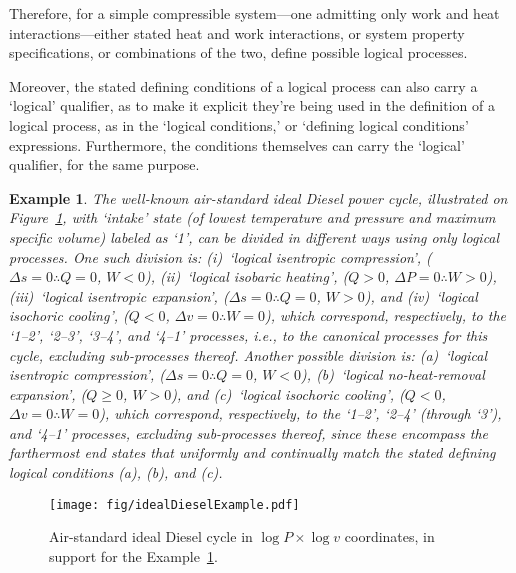 \documentclass[fleqn,11pt]{SelfArx}
\newtheorem{example}{Example}
\begin{document}
    Therefore,  for  a  simple  compressible  system---one  admitting   only   work   and   heat
    interactions---either stated heat and work interactions, or system property  specifications,
    or combinations of the two, define possible logical processes.

    Moreover, the stated defining conditions of a logical process can  also  carry  a  `logical'
    qualifier, as to make it explicit they're being used in the definition of a logical process,
    as in the `logical conditions,' or `defining logical conditions'  expressions.  Furthermore,
    the conditions themselves can carry the `logical' qualifier, for the same purpose.

    \begin{example}\label{ex:ideal.Diesel}
        The   well-known   air-standard   ideal   Diesel    power    cycle,    illustrated    on
        Figure~\ref{fig:cycle.Diesel}, with `intake' state (of lowest temperature  and  pressure
        and maximum specific volume) labeled as `1', can be divided in different ways using only
        logical processes. One such division is: (i)~`logical isentropic compression',  ($\Delta
        s\!=\!0 \therefore Q\!=\!0$, $W\!\!<\!0$), (ii)~`logical isobaric heating',  ($Q\!>\!0$,
        $\Delta P\!=\!0 \therefore W\!\!>\!0$), (iii)~`logical isentropic  expansion',  ($\Delta
        s\!=\!0  \therefore  Q\!=\!0$,  $W\!\!>\!0$),  and  (iv)~`logical  isochoric   cooling',
        ($Q\!<\!0$, $\Delta v\!=\!0 \therefore W\!\!=\!0$), which correspond,  respectively,  to
        the `1--2', `2--3', `3--4', and `4--1' processes, i.e., to the canonical  processes  for
        this cycle, excluding sub-processes thereof. Another possible division is:  (a)~`logical
        isentropic   compression',   ($\Delta   s\!=\!0   \therefore   Q\!=\!0$,   $W\!\!<\!0$),
        (b)~`logical   no-heat-removal   expansion',   ($Q\!\geqslant\!0$,   $W\!\!>\!0$),   and
        (c)~`logical isochoric cooling', ($Q\!<\!0$,  $\Delta  v\!=\!0  \therefore  W\!\!=\!0$),
        which correspond,  respectively,  to  the  `1--2',  `2--4'  (through  `3'),  and  `4--1'
        processes, excluding sub-processes thereof, since these encompass  the  farthermost  end
        states that uniformly and continually match the stated defining logical conditions  (a),
        (b), and (c).
    \end{example}

    \begin{figure}[ht]
        \centering
        \texttt{[image: fig/idealDieselExample.pdf]}
        \caption{Air-standard ideal Diesel cycle in $\log  P  \times  \log  v$  coordinates,  in
            support for the Example~\ref{ex:ideal.Diesel}.}
        \label{fig:cycle.Diesel}
    \end{figure}
\end{document}
